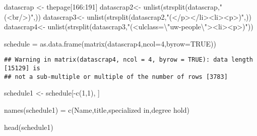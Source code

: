 \documentclass[
]{article}
\newenvironment{Shaded}{\begin{snugshade}}{\end{snugshade}}
\newcommand{\AttributeTok}[1]{\textcolor[rgb]{0.77,0.63,0.00}{#1}}
\newcommand{\ConstantTok}[1]{\textcolor[rgb]{0.00,0.00,0.00}{#1}}
\newcommand{\DecValTok}[1]{\textcolor[rgb]{0.00,0.00,0.81}{#1}}
\newcommand{\FunctionTok}[1]{\textcolor[rgb]{0.00,0.00,0.00}{#1}}
\newcommand{\NormalTok}[1]{#1}
\newcommand{\OtherTok}[1]{\textcolor[rgb]{0.56,0.35,0.01}{#1}}
\newcommand{\SpecialCharTok}[1]{\textcolor[rgb]{0.00,0.00,0.00}{#1}}
\newcommand{\StringTok}[1]{\textcolor[rgb]{0.31,0.60,0.02}{#1}}
\begin{document}
\begin{Shaded}
\begin{Highlighting}[]
\NormalTok{datascrap }\OtherTok{\textless{}{-}}\NormalTok{ thepage[}\DecValTok{166}\SpecialCharTok{:}\DecValTok{191}\NormalTok{]}
\NormalTok{datascrap2}\OtherTok{\textless{}{-}} \FunctionTok{unlist}\NormalTok{(}\FunctionTok{strsplit}\NormalTok{(datascrap,}\StringTok{"(\textless{}br/\textgreater{})"}\NormalTok{,))}
\NormalTok{datascrap3}\OtherTok{\textless{}{-}} \FunctionTok{unlist}\NormalTok{(}\FunctionTok{strsplit}\NormalTok{(datascrap2,}\StringTok{"(\textless{}/p\textgreater{}\textless{}/li\textgreater{}\textless{}li\textgreater{}\textless{}p\textgreater{})"}\NormalTok{,))}
\NormalTok{datascrap4}\OtherTok{\textless{}{-}} \FunctionTok{unlist}\NormalTok{(}\FunctionTok{strsplit}\NormalTok{(datascrap3,}\StringTok{"(\textless{}ulclass=}\SpecialCharTok{\textbackslash{}"}\StringTok{uw{-}people}\SpecialCharTok{\textbackslash{}"}\StringTok{\textgreater{}\textless{}li\textgreater{}\textless{}p\textgreater{})"}\NormalTok{))}

\NormalTok{schedule }\OtherTok{=} \FunctionTok{as.data.frame}\NormalTok{(}\FunctionTok{matrix}\NormalTok{(datascrap4,}\AttributeTok{ncol=}\DecValTok{4}\NormalTok{,}\AttributeTok{byrow=}\ConstantTok{TRUE}\NormalTok{))}
\end{Highlighting}
\end{Shaded}

\begin{verbatim}
## Warning in matrix(datascrap4, ncol = 4, byrow = TRUE): data length [15129] is
## not a sub-multiple or multiple of the number of rows [3783]
\end{verbatim}

\begin{Shaded}
\begin{Highlighting}[]
\NormalTok{schedule1 }\OtherTok{\textless{}{-}}\NormalTok{ schedule[}\SpecialCharTok{{-}}\FunctionTok{c}\NormalTok{(}\DecValTok{1}\NormalTok{,}\DecValTok{1}\NormalTok{), ]}

\FunctionTok{names}\NormalTok{(schedule1) }\OtherTok{=} \FunctionTok{c}\NormalTok{(}\StringTok{\textquotesingle{}Name\textquotesingle{}}\NormalTok{,}\StringTok{\textquotesingle{}title\textquotesingle{}}\NormalTok{,}\StringTok{\textquotesingle{}specialized in\textquotesingle{}}\NormalTok{,}\StringTok{\textquotesingle{}degree hold\textquotesingle{}}\NormalTok{) }

\FunctionTok{head}\NormalTok{(schedule1) }
\end{Highlighting}
\end{Shaded}
\end{document}
